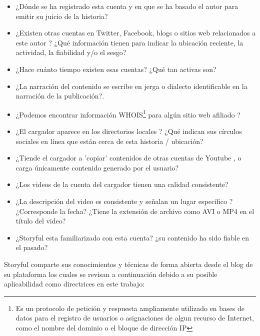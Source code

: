 \begin{itemize}
	\item ¿Dónde se ha registrado esta cuenta y en que se ha basado el autor para emitir su juicio de la historia?
	\item ¿Existen otras cuentas en Twitter, Facebook, blogs o sitios web relacionados a este autor ? ¿Qué información tienen para indicar la ubicación reciente, la actividad, la fiabilidad y/o el sesgo?
	\item ¿Hace cuánto tiempo existen esas cuentas? ¿Qué tan activas son?
	\item ¿La narración del contenido se escribe en jerga o dialecto identificable en la narración de la publicación?.
	\item ¿Podemos encontrar información WHOIS\footnote{Es un protocolo de petición y respuesta ampliamente utilizado en bases de datos para el registro de usuarios o asignaciones de algun recurso de Internet, como el nombre del dominio o el bloque de dirección IP} para algún sitio web afiliado ?
	\item ¿El cargador aparece en los directorios locales ? ¿Qué indican sus círculos sociales en línea que están cerca de esta historia / ubicación?
	\item ¿Tiende el cargador a 'copiar' contenidos de otras cuentas de Youtube , o carga únicamente contenido generado por el usuario?
	\item ¿Los videos de la cuenta del cargador tienen una calidad consistente?
	\item ¿La descripción del video es consistente y señalan un lugar específico ? ¿Corresponde la fecha? ¿Tiene la extensión de archivo como AVI o MP4 en el título del video?
	\item ¿Storyful esta familiarizado con esta cuenta? ¿su contenido ha sido fiable en el pasado?
\end{itemize}

Storyful comparte sus conocimientos y técnicas de forma abierta desde el blog de su plataforma los cuales se revisan a continuación debido a su posible aplicabilidad como directrices en este trabajo:

